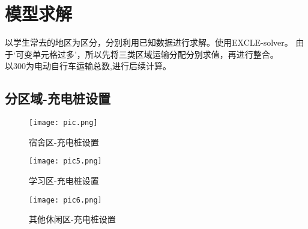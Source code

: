 \section{模型求解}
以学生常去的地区为区分，分别利用已知数据进行求解。使用EXCLE-solver。 由于‘可变单元格过多’，所以先将三类区域运输分配分别求值，再进行整合。\\
\indent 以300为电动自行车运输总数,进行后续计算。
\subsection{分区域-充电桩设置}
\begin{figure}[H]
    \centering
    \texttt{[image: pic.png]}
    \caption{宿舍区-充电桩设置}
\end{figure}
\begin{figure}[H]
    \centering
    \texttt{[image: pic5.png]}
    \caption{学习区-充电桩设置}
\end{figure}
\begin{figure}[H]
    \centering
    \texttt{[image: pic6.png]}
    \caption{其他休闲区-充电桩设置}
\end{figure}
